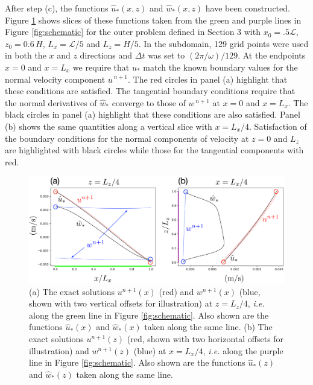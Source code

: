 \documentclass{jfm-like}
\begin{document}
\vspace{14pt}
After step (c), the functions ${\hat u}_*(x,z)$ and ${\hat w}_*(x,z)$ have been constructed. Figure \ref{fig:projection_slices} shows slices of these functions taken from the green and purple lines in Figure \ref{fig:schematic}
for the outer problem defined in Section 3 with $x_0= .5 {\mathcal L}$, $z_0=0.6\,H$,  $L_x= {\mathcal L}/5$ and $L_z= H/5$. In the subdomain, 129 grid points were used in both the $x$ and $z$ directions and
 $\Delta t$ was set to $(2\pi/\omega)/129$. At the endpoints $x=0$ and $x=L_x$ we require that $u_*$ match the known boundary values for the normal velocity component $u^{\,n+1}$. The red circles in panel (a) highlight that these conditions are satisfied.
The tangential boundary conditions require that the normal derivatives of ${\hat w}_*$ converge to those of $w^{\,n+1}$ at  $x=0$ and $x=L_x$. The black circles in panel (a) highlight that these conditions are also satisfied.
 Panel (b) shows the same quantities along a vertical slice with $x=L_x/4$. Satisfaction of the boundary conditions  for the normal components of velocity at $z=0$ and $L_z$ are highlighted with black circles while those for the
 tangential components with red.
  \begin{figure}
  \centerline{\includegraphics[width=1.0\textwidth]{FIGS/projection_slices.eps}}
  \caption{(a) The exact solutions $u^{n+1}(x)$ (red) and $w^{n+1}(x)$ (blue, shown with two vertical offsets for illustration) at $z=L_z/4$, {\em i.e.} along the green line in Figure \ref{fig:schematic}. 
  Also shown are the functions ${\hat u}_*(x)$ and  ${\hat w}_*(x)$ taken along the same line.
  (b) The exact solutions $u^{n+1}(z)$ (red,  shown with two horizontal offsets for illustration) and $w^{n+1}(z)$ (blue) at $x=L_x/4$, {\em i.e.} along the purple line in Figure \ref{fig:schematic}. 
  Also shown are the functions ${\hat u}_*(z)$ and  ${\hat w}_*(z)$ taken along the same line.} 
  \label{fig:projection_slices}
\end{figure}
\end{document}
